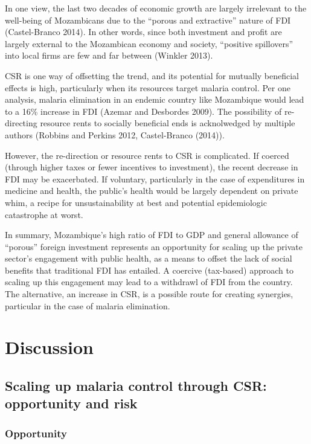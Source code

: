 \documentclass[]{elsarticle} %
\begin{document}
In one view, the last two decades of economic growth are largely
irrelevant to the well-being of Mozambicans due to the ``porous and
extractive'' nature of FDI (Castel-Branco 2014). In other words, since
both investment and profit are largely external to the Mozambican
economy and society, ``positive spillovers'' into local firms are few
and far between (Winkler 2013).

CSR is one way of offsetting the trend, and its potential for mutually
beneficial effects is high, particularly when its resources target
malaria control. Per one analysis, malaria elimination in an endemic
country like Mozambique would lead to a 16\% increase in FDI (Azemar and
Desbordes 2009). The possibility of re-directing resource rents to
socially beneficial ends is acknolwedged by multiple authors (Robbins
and Perkins 2012, Castel-Branco (2014)).

However, the re-direction or resource rents to CSR is complicated. If
coerced (through higher taxes or fewer incentives to investment), the
recent decrease in FDI may be exacerbated. If voluntary, particularly in
the case of expenditures in medicine and health, the public's health
would be largely dependent on private whim, a recipe for
unsustainability at best and potential epidemiologic catastrophe at
worst.

In summary, Mozambique's high ratio of FDI to GDP and general allowance
of ``porous'' foreign investment represents an opportunity for scaling
up the private sector's engagement with public health, as a means to
offset the lack of social benefits that traditional FDI has entailed. A
coercive (tax-based) approach to scaling up this engagement may lead to
a withdrawl of FDI from the country. The alternative, an increase in
CSR, is a possible route for creating synergies, particular in the case
of malaria elimination.

\section{Discussion}\label{discussion}

\subsection{Scaling up malaria control through CSR: opportunity and
risk}\label{scaling-up-malaria-control-through-csr-opportunity-and-risk}

\subsubsection{Opportunity}\label{opportunity}
\end{document}
